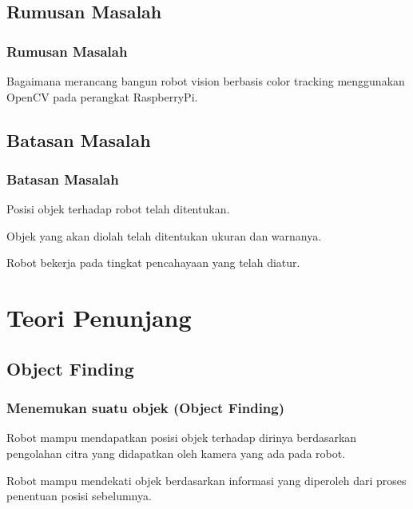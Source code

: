 \documentclass[table,dvipsnames]{beamer}
\begin{document}
\subsection{Rumusan Masalah}

\begin{frame}
\frametitle{Rumusan Masalah}
\begin{block}{}
Bagaimana merancang bangun robot vision berbasis color tracking menggunakan OpenCV pada perangkat RaspberryPi.
\end{block}
\end{frame}

\subsection{Batasan Masalah}

\begin{frame}
\frametitle{Batasan Masalah}
\begin{block}{}
Posisi objek terhadap robot telah ditentukan.
\end{block}
\begin{block}{}
Objek yang akan diolah telah ditentukan ukuran dan warnanya.
\end{block}
\begin{block}{}
Robot bekerja pada tingkat pencahayaan yang telah diatur.
\end{block}
\end{frame}


\section{Teori Penunjang}

\subsection{Object Finding}

\begin{frame}
\frametitle{Menemukan suatu objek (Object Finding)}
\begin{block}{}
Robot mampu mendapatkan posisi objek terhadap dirinya berdasarkan pengolahan citra yang didapatkan oleh kamera yang ada pada robot.
\end{block}
\begin{block}{}
Robot mampu mendekati objek berdasarkan informasi yang diperoleh dari proses penentuan posisi sebelumnya.
\end{block}
\end{frame}
\end{document}
